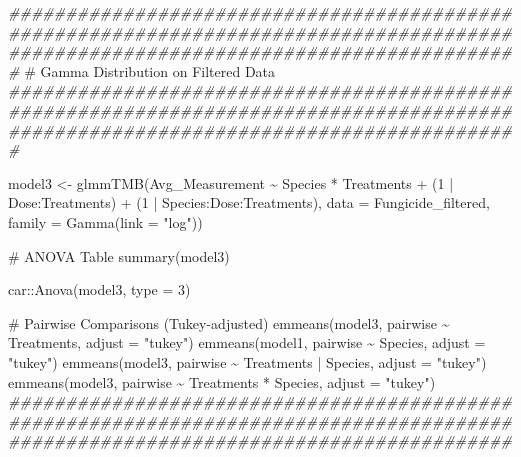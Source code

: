 \documentclass[
  10pt,
  letterpaper,
  twocolumn]{article}
\newenvironment{Shaded}{\begin{snugshade}}{\end{snugshade}}
\newcommand{\AttributeTok}[1]{\textcolor[rgb]{0.40,0.45,0.13}{#1}}
\newcommand{\CommentTok}[1]{\textcolor[rgb]{0.37,0.37,0.37}{#1}}
\newcommand{\DecValTok}[1]{\textcolor[rgb]{0.68,0.00,0.00}{#1}}
\newcommand{\DocumentationTok}[1]{\textcolor[rgb]{0.37,0.37,0.37}{\textit{#1}}}
\newcommand{\FunctionTok}[1]{\textcolor[rgb]{0.28,0.35,0.67}{#1}}
\newcommand{\NormalTok}[1]{\textcolor[rgb]{0.00,0.23,0.31}{#1}}
\newcommand{\OtherTok}[1]{\textcolor[rgb]{0.00,0.23,0.31}{#1}}
\newcommand{\SpecialCharTok}[1]{\textcolor[rgb]{0.37,0.37,0.37}{#1}}
\newcommand{\StringTok}[1]{\textcolor[rgb]{0.13,0.47,0.30}{#1}}
\begin{document}
\begin{Shaded}
\begin{Highlighting}[]
\DocumentationTok{\#\#\#\#\#\#\#\#\#\#\#\#\#\#\#\#\#\#\#\#\#\#\#\#\#\#\#\#\#\#\#\#\#\#\#\#\#\#\#\#\#\#\#\#\#\#\#\#\#\#\#\#\#\#\#\#\#\#\#\#\#\#\#\#\#\#\#\#\#\#\#\#\#\#\#\#\#\#\#\#\#\#\#\#\#\#\#\#\#\#\#\#\#\#\#\#\#\#\#\#\#\#\#\#\#\#\#\#\#\#\#\#\#\#\#\#\#\#\#\#\#\#\#\#\#\#\#\#\#\#\#\#\#}
\CommentTok{\# Gamma Distribution on Filtered Data}
\DocumentationTok{\#\#\#\#\#\#\#\#\#\#\#\#\#\#\#\#\#\#\#\#\#\#\#\#\#\#\#\#\#\#\#\#\#\#\#\#\#\#\#\#\#\#\#\#\#\#\#\#\#\#\#\#\#\#\#\#\#\#\#\#\#\#\#\#\#\#\#\#\#\#\#\#\#\#\#\#\#\#\#\#\#\#\#\#\#\#\#\#\#\#\#\#\#\#\#\#\#\#\#\#\#\#\#\#\#\#\#\#\#\#\#\#\#\#\#\#\#\#\#\#\#\#\#\#\#\#\#\#\#\#\#\#\#}

\NormalTok{model3 }\OtherTok{\textless{}{-}} \FunctionTok{glmmTMB}\NormalTok{(Avg\_Measurement }\SpecialCharTok{\textasciitilde{}}\NormalTok{ Species }\SpecialCharTok{*}\NormalTok{ Treatments }\SpecialCharTok{+} 
\NormalTok{                    (}\DecValTok{1} \SpecialCharTok{|}\NormalTok{ Dose}\SpecialCharTok{:}\NormalTok{Treatments) }\SpecialCharTok{+}\NormalTok{ (}\DecValTok{1} \SpecialCharTok{|}\NormalTok{ Species}\SpecialCharTok{:}\NormalTok{Dose}\SpecialCharTok{:}\NormalTok{Treatments), }
                  \AttributeTok{data =}\NormalTok{ Fungicide\_filtered, }
                  \AttributeTok{family =} \FunctionTok{Gamma}\NormalTok{(}\AttributeTok{link =} \StringTok{"log"}\NormalTok{))}

\CommentTok{\# ANOVA Table}
\FunctionTok{summary}\NormalTok{(model3)}

\NormalTok{car}\SpecialCharTok{::}\FunctionTok{Anova}\NormalTok{(model3, }\AttributeTok{type =} \DecValTok{3}\NormalTok{)}

\CommentTok{\# Pairwise Comparisons (Tukey{-}adjusted)}
\FunctionTok{emmeans}\NormalTok{(model3, pairwise }\SpecialCharTok{\textasciitilde{}}\NormalTok{ Treatments, }\AttributeTok{adjust =} \StringTok{"tukey"}\NormalTok{)}
\FunctionTok{emmeans}\NormalTok{(model1, pairwise }\SpecialCharTok{\textasciitilde{}}\NormalTok{ Species, }\AttributeTok{adjust =} \StringTok{"tukey"}\NormalTok{)}
\FunctionTok{emmeans}\NormalTok{(model3, pairwise }\SpecialCharTok{\textasciitilde{}}\NormalTok{ Treatments }\SpecialCharTok{|}\NormalTok{ Species, }\AttributeTok{adjust =} \StringTok{"tukey"}\NormalTok{)}
\FunctionTok{emmeans}\NormalTok{(model3, pairwise }\SpecialCharTok{\textasciitilde{}}\NormalTok{ Treatments }\SpecialCharTok{*}\NormalTok{ Species, }\AttributeTok{adjust =} \StringTok{"tukey"}\NormalTok{)}
\DocumentationTok{\#\#\#\#\#\#\#\#\#\#\#\#\#\#\#\#\#\#\#\#\#\#\#\#\#\#\#\#\#\#\#\#\#\#\#\#\#\#\#\#\#\#\#\#\#\#\#\#\#\#\#\#\#\#\#\#\#\#\#\#\#\#\#\#\#\#\#\#\#\#\#\#\#\#\#\#\#\#\#\#\#\#\#\#\#\#\#\#\#\#\#\#\#\#\#\#\#\#\#\#\#\#\#\#\#\#\#\#\#\#\#\#\#\#\#\#\#\#\#\#\#\#\#\#\#\#\#\#\#\#\#\#}



\end{Highlighting}
\end{Shaded}
\end{document}
